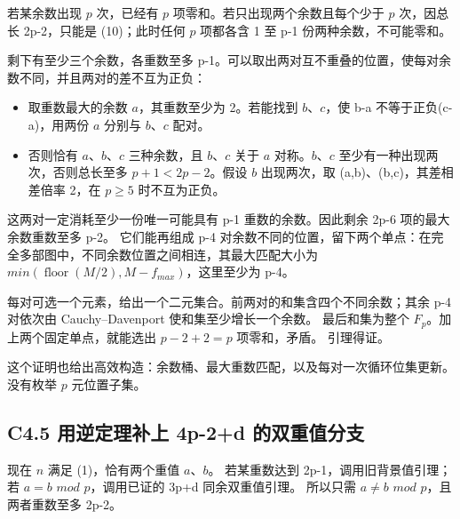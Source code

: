 \documentclass[11pt,a4paper]{article}
\newcommand{\tightlist}{\setlength{\itemsep}{0pt}\setlength{\parskip}{0pt}}
\theoremstyle{definition}
\numberwithin{equation}{section}
\begin{document}
{若某余数出现} {\ensuremath{p}} {次，已经有} {\ensuremath{p}} {项零和。若只出现两个余数且每个少于} {\ensuremath{p}} {次，因总长} {2p-2，只能是} {(10)；此时任何} {\ensuremath{p}} {项都各含} {1} {至} {p-1} {份两种余数，不可能零和。}

{剩下有至少三个余数，各重数至多} {p-1。可以取出两对互不重叠的位置，使每对余数不同，并且两对的差不互为正负：}

\begin{itemize}
\tightlist
\item
  {取重数最大的余数} {\ensuremath{a}，其重数至少为} {2。若能找到} {\ensuremath{b}、\ensuremath{c}，使} {b-a} {不等于正负(c-a)，用两份} {\ensuremath{a}} {分别与} {\ensuremath{b}、\ensuremath{c}} {配对。}
\item
  {否则恰有} {\ensuremath{a}、\ensuremath{b}、\ensuremath{c}} {三种余数，且} {\ensuremath{b}、\ensuremath{c}} {关于} {\ensuremath{a}} {对称。\ensuremath{b}、\ensuremath{c}} {至少有一种出现两次，否则总长至多} {\ensuremath{p+1<2p-2}。假设} {\ensuremath{b}} {出现两次，取} {(a,b)、(b,c)，其差相差倍率} {2，在} {\ensuremath{p\ge 5}} {时不互为正负。}
\end{itemize}

{这两对一定消耗至少一份唯一可能具有} {p-1} {重数的余数。因此剩余} {2p-6} {项的最大余数重数至多} {p-2。} {它们能再组成} {p-4} {对余数不同的位置，留下两个单点：在完全多部图中，不同余数位置之间相连，其最大匹配大小为} {\ensuremath{min(\operatorname{floor}(M/2),M-f_{max})}，这里至少为} {p-4。}

{每对可选一个元素，给出一个二元集合。前两对的和集含四个不同余数；其余} {p-4} {对依次由} {Cauchy--Davenport} {使和集至少增长一个余数。} {最后和集为整个} {\ensuremath{F_{p}}。加上两个固定单点，就能选出} {\ensuremath{p-2+2=p}} {项零和，矛盾。} {引理得证。}

{这个证明也给出高效构造：余数桶、最大重数匹配，以及每对一次循环位集更新。没有枚举} {\ensuremath{p}} {元位置子集。}

\subsection*{\texorpdfstring{{C4.5} {用逆定理补上} {4p-2+d} {的双重值分支}}{C4.5 用逆定理补上 4p-2+d 的双重值分支}}\label{C4-h23}

{现在} {\ensuremath{n}} {满足} {(1)，恰有两个重值} {\ensuremath{a}、\ensuremath{b}。} {若某重数达到} {2p-1，调用旧背景值引理；若} {\ensuremath{a=b}} {\ensuremath{mod}} {\ensuremath{p}，调用已证的} {3p+d} {同余双重值引理。} {所以只需} {\ensuremath{a\ne b}} {\ensuremath{mod}} {\ensuremath{p}，且两者重数至多} {2p-2。}
\end{document}
